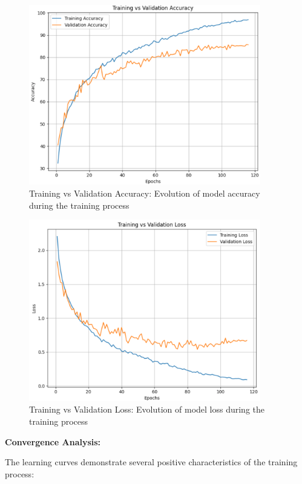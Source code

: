 \begin{figure}[ht]
\centering
\includegraphics[width=0.9\textwidth]{training-vs-validation-accuracy.png}
\caption{Training vs Validation Accuracy: Evolution of model accuracy during the training process}
\label{fig:training_validation_accuracy}
\end{figure}

\begin{figure}[ht]
\centering
\includegraphics[width=0.9\textwidth]{training-vs-validation-loss.png}
\caption{Training vs Validation Loss: Evolution of model loss during the training process}
\label{fig:training_validation_loss}
\end{figure}

\textbf{Convergence Analysis:}

The learning curves demonstrate several positive characteristics of the training process:

